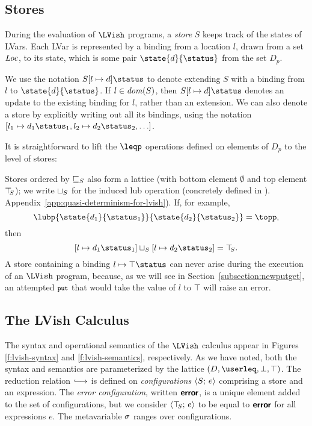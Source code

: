 \subsection{Stores}

During the evaluation of $\LVish$ programs, a \emph{store} $S$ keeps
track of the states of LVars.  Each LVar is represented by a binding
from a location $l$, drawn from a set $\mathit{Loc}$, to its state, which is
some pair $\state{d}{\status}$ from the set $D_p$.

\DefStore

\noindent We use the notation $\extS{S}{l}{d}{\status}$ to denote
extending $S$ with a binding from $l$ to $\state{d}{\status}$.  If $l \in
\mathit{dom}(S)$, then $\extS{S}{l}{d}{\status}$ denotes an update to the
existing binding for $l$, rather than an extension.  We can also
denote a store by explicitly writing out all its bindings, using the
notation $\store{\storebinding{l_1}{d_1}{\status_1},
  \storebinding{l_2}{d_2}{\status_2}, \dots}$.

It is straightforward to lift the $\leqp$ operations
defined on elements of $D_p$ to the level of stores:

\DefLeqStore


\noindent
Stores ordered by $ \sqsubseteq_S $ also form a lattice (with bottom element
$\emptyset$ and top element $\top\hspace{-0.85mm}_{S}$); we write $ \sqcup_{S} $ for the induced
lub operation (concretely defined in 
\ifx\fulltr\undefined
\cite{Freeze-TR}).
\else
Appendix~\ref{app:quasi-determinism-for-lvish}).
\fi
If, for example,
\[ \lubp{\state{d_1}{\status_1}}{\state{d_2}{\status_2}} = \topp, \]
then
\[ \lubstore{\store{\storebinding{l}{d_1}{\status_1}}}{\store{\storebinding{l}{d_2}{\status_2}}} =
\topS. \] 
A store containing a binding $\storebinding{l}{\top}{\status}$ can
never arise during the execution of an $\LVish$ program, because, as we will see
in Section~\ref{subsection:newputget}, an attempted $\mbox{\footnotesize \texttt{put}}$ that would take the
value of $l$ to $\top$ will raise an error.

\subsection{The LVish Calculus}

\FigLVishGrammar[t]

\FigLVishSemantics[t]

The syntax and operational semantics of the $\LVish$ calculus appear in Figures
\ref{f:lvish-syntax} and \ref{f:lvish-semantics}, respectively.  As we
have noted, both the syntax and semantics are parameterized by the
lattice $(D, \userleq, \bot, \top)$.  The reduction relation $\parstepsto$ is
defined on \emph{configurations} $\langle S;\, e \rangle$ comprising a store
and an expression.  The \emph{error configuration}, written $\textbf{\textsf{error}}$,
is a unique element added to the set of configurations, but we
consider $\langle \top\hspace{-0.85mm}_{S};\, e \rangle$ to be equal to $\textbf{\textsf{error}}$ for all
expressions $e$.  The metavariable $\sigma$ ranges over configurations.


